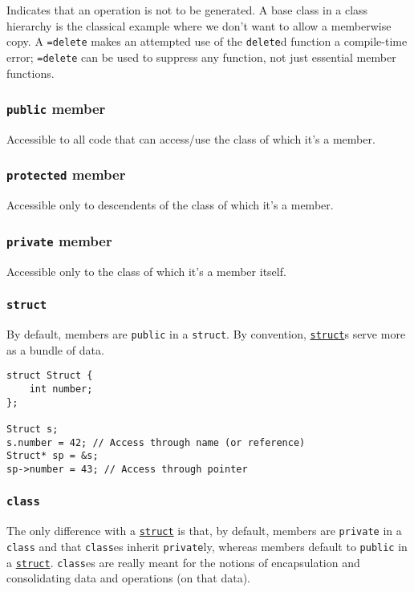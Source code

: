 \documentclass[8pt, table, xcdraw]{article}%
\begin{document}
Indicates that an operation is not to be generated. A base class in a class hierarchy is the classical example where we don’t want to allow a memberwise copy. A \lstinline{=delete} makes an attempted use of the \lstinline{delete}d function a compile-time error; \lstinline{=delete} can be used to suppress any function, not just essential member functions.

\subsubsection{\lstinline{public} member}

Accessible to all code that can access/use the class of which it's a member.

\subsubsection{\lstinline{protected} member}

Accessible only to descendents of the class of which it's a member.

\subsubsection{\lstinline{private} member}

Accessible only to the class of which it's a member itself.

\subsubsection{\lstinline{struct}} \label{struct}

By default, members are \lstinline{public} in a \lstinline{struct}. By convention, \hyperref[struct]{\lstinline{struct}}s serve more as a bundle of data.

\begin{lstlisting}
struct Struct {
    int number;
};

Struct s;
s.number = 42; // Access through name (or reference)
Struct* sp = &s;
sp->number = 43; // Access through pointer
\end{lstlisting}

\subsubsection{\lstinline{class}} \label{class}

The only difference with a \hyperref[struct]{\lstinline{struct}} is that, by default, members are \lstinline{private} in a \lstinline{class} and that \lstinline{class}es inherit \lstinline{private}ly, whereas members default to \lstinline{public} in a \hyperref[struct]{\lstinline{struct}}. \lstinline{class}es are really meant for the notions of encapsulation and consolidating data and operations (on that data).
\end{document}
